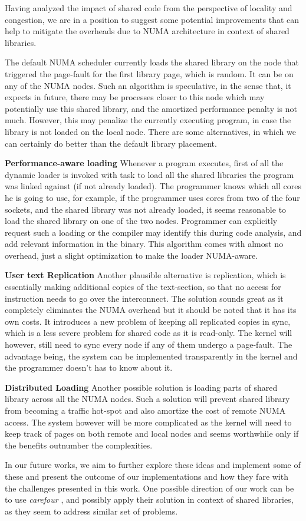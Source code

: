 
Having analyzed the impact of shared code from the perspective of locality and congestion,
we are in a position to suggest some potential improvements that can help to mitigate the
overheads due to NUMA architecture in context of shared libraries.

The default NUMA scheduler currently loads the shared library on the node that triggered
the page-fault for the first library page, which is random. It can be on any of the NUMA nodes.
Such an algorithm is speculative, in the sense that, it expects in future, there may be processes
closer to this node which may potentially use this shared library, and the amortized performance
penalty is not much. However, this may penalize the currently executing program, in case the library
is not loaded on the local node. There are some alternatives, in which we can certainly do better
than the default library placement.

\textbf{Performance-aware loading} Whenever a program executes, first of all the dynamic loader is
invoked with task to load all the shared libraries the program was linked against (if not already loaded).
The programmer knows which all cores he is going to use, for example, if the programmer uses cores from 
two of the four sockets, and the shared library was not already loaded, it seems reasonable to load
the shared library on one of the two nodes. Programmer can explicitly request such a loading or the
compiler may identify this during code analysis, and add relevant information in the binary. This
algorithm comes with almost no overhead, just a slight optimization to make the loader NUMA-aware.

\textbf{User text Replication} Another plausible alternative is replication, which is essentially making
additional copies of the text-section, so that no access for instruction needs to go over the interconnect.
The solution sounds great as it completely eliminates the NUMA overhead but it should be noted that it has
its own costs. It introduces a new problem of keeping all replicated copies in sync, which is a less severe
problem for shared code as it is read-only. The kernel will however, still need to sync every node if any 
of them undergo a page-fault. The advantage being, the system can be implemented transparently in the
kernel and the programmer doesn't has to know about it.

\textbf{Distributed Loading} Another possible solution is loading parts of shared library across all the
NUMA nodes. Such a solution will prevent shared library from becoming a traffic hot-spot and also amortize
the cost of remote NUMA access. The system however will be more complicated as the kernel will need to
keep track of pages on both remote and local nodes and seems worthwhile only if the benefits outnumber the
complexities.

In our future works, we aim to further explore these ideas and implement some of these and present the
outcome of our implementations and how they fare with the challenges presented in this work. One possible
direction of our work can be to use \textit{carefour} \cite{Dashti:2013:TMH:2490301.2451157}, and possibly 
apply their solution in context of shared libraries, as they seem to address similar set of problems.

